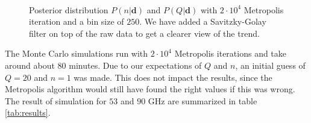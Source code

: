 \documentclass{emulateapj}
\begin{document}
\begin{figure}[t!]
\centering
{}\\
\caption{Posterior distribution $P(n|\mathbf{d})$ and $P(Q|\mathbf{d})$ with $2\cdot 10^4$ Metropolis iteration and a bin size of $250$. We have added a Savitzky-Golay filter on top of the raw data to get a clearer view of the trend.}
\label{fig:QnDist}
\end{figure}


The Monte Carlo simulations run with $2\cdot 10^4$ Metropolis iterations and take around about $80$ minutes. Due to our expectations of $Q$ and $n$, an initial guess of $Q = 20$ and $n = 1$ was made. This does not impact the results, since the Metropolis algorithm would still have found the right values if this was wrong. The result of simulation for $53$ and $90$ GHz are summarized in table \ref{tab:results}.\
\end{document}
